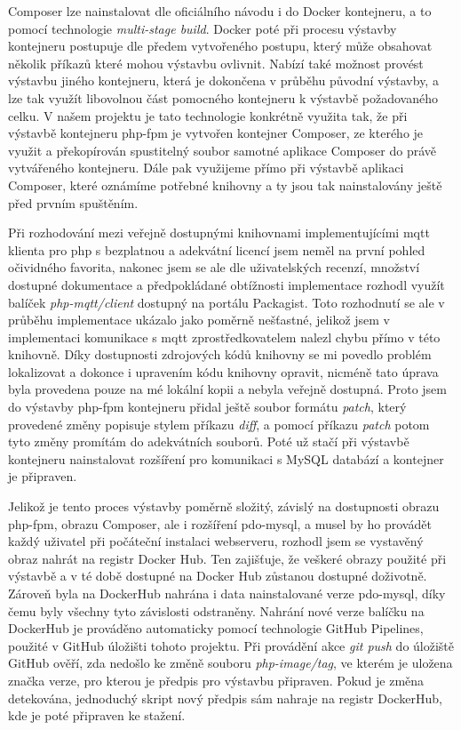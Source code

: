 Composer lze nainstalovat dle oficiálního návodu i do Docker kontejneru, a to pomocí technologie \emph{multi-stage build}. Docker poté při procesu výstavby kontejneru postupuje dle předem vytvořeného postupu, který může obsahovat několik příkazů které mohou výstavbu ovlivnit. Nabízí také možnost provést výstavbu jiného kontejneru, která je dokončena v průběhu původní výstavby, a lze tak využít libovolnou část pomocného kontejneru k výstavbě požadovaného celku. V našem projektu je tato technologie konkrétně využita tak, že při výstavbě kontejneru \acrshort{php-fpm} je vytvořen kontejner Composer, ze kterého je využit a překopírován spustitelný soubor samotné aplikace Composer do právě vytvářeného kontejneru. Dále pak využijeme přímo při výstavbě aplikaci Composer, které oznámíme potřebné knihovny a ty jsou tak nainstalovány ještě před prvním spuštěním.

Při rozhodování mezi veřejně dostupnými knihovnami implementujícími \acrshort{mqtt} klienta pro \acrshort{php} s bezplatnou a adekvátní licencí jsem neměl na první pohled očividného favorita, nakonec jsem se ale dle uživatelských recenzí, množství dostupné dokumentace a předpokládané obtížnosti implementace rozhodl využít balíček \emph{php-mqtt/client} dostupný na portálu Packagist. Toto rozhodnutí se ale v průběhu implementace ukázalo jako poměrně nešťastné, jelikož jsem v implementaci komunikace s \acrshort{mqtt} zprostředkovatelem nalezl chybu přímo v této knihovně. Díky dostupnosti zdrojových kódů knihovny se mi povedlo problém lokalizovat a dokonce i upravením kódu knihovny opravit, nicméně tato úprava byla provedena pouze na mé lokální kopii a nebyla veřejně dostupná. Proto jsem do výstavby \acrshort{php-fpm} kontejneru přidal ještě soubor formátu \emph{patch}, který provedené změny popisuje stylem příkazu \emph{diff}, a pomocí příkazu \emph{patch} potom tyto změny promítám do adekvátních souborů. Poté už stačí při výstavbě kontejneru nainstalovat rozšíření pro komunikaci s MySQL databází a kontejner je připraven.

Jelikož je tento proces výstavby poměrně složitý, závislý na dostupnosti obrazu \acrshort{php-fpm}, obrazu Composer, ale i rozšíření pdo-mysql, a musel by ho provádět každý uživatel při počáteční instalaci webserveru, rozhodl jsem se vystavěný obraz nahrát na registr Docker Hub. Ten zajišťuje, že veškeré obrazy použité při výstavbě a v té době dostupné na Docker Hub zůstanou dostupné doživotně. Zároveň byla na DockerHub nahrána i data nainstalované verze pdo-mysql, díky čemu byly všechny tyto závislosti odstraněny. Nahrání nové verze balíčku na DockerHub je prováděno automaticky pomocí technologie GitHub Pipelines, použité v GitHub úložišti tohoto projektu. Při provádění akce \emph{git push} do úložiště GitHub ověří, zda nedošlo ke změně souboru \emph{php-image/tag}, ve kterém je uložena značka verze, pro kterou je předpis pro výstavbu připraven. Pokud je změna detekována, jednoduchý skript nový předpis sám nahraje na registr DockerHub, kde je poté připraven ke stažení.

